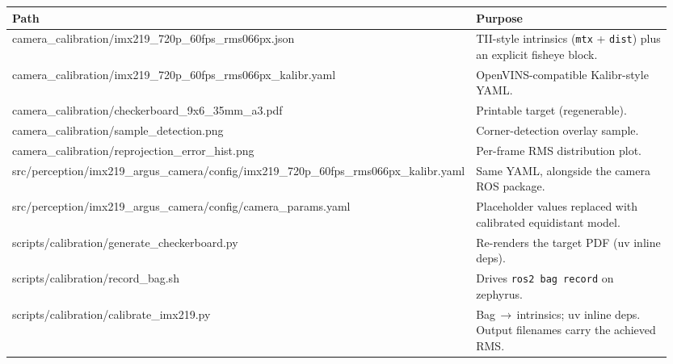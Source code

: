 \documentclass[11pt,a4paper]{article}
\begin{document}
\begin{center}
\sffamily\footnotesize
\renewcommand{\arraystretch}{1.45}
\begin{tabular}{@{}>{\ttfamily\color{ethText}}p{0.55\linewidth} >{\sffamily\color{ethMuted}}p{0.40\linewidth}@{}}
\toprule
\textsf{\bfseries\color{ethAccentBold}Path} & \textsf{\bfseries\color{ethAccentBold}Purpose}\\
\midrule
camera\_calibration/\newline\hspace*{8pt}imx219\_720p\_60fps\_rms066px.json
  & TII-style intrinsics (\texttt{mtx} + \texttt{dist}) plus an explicit fisheye block.\\
camera\_calibration/\newline\hspace*{8pt}imx219\_720p\_60fps\_rms066px\_kalibr.yaml
  & OpenVINS-compatible Kalibr-style YAML.\\
camera\_calibration/\newline\hspace*{8pt}checkerboard\_9x6\_35mm\_a3.pdf
  & Printable target (regenerable).\\
camera\_calibration/sample\_detection.png
  & Corner-detection overlay sample.\\
camera\_calibration/\newline\hspace*{8pt}reprojection\_error\_hist.png
  & Per-frame RMS distribution plot.\\
src/perception/imx219\_argus\_camera/\newline\hspace*{8pt}config/imx219\_720p\_60fps\_rms066px\_kalibr.yaml
  & Same YAML, alongside the camera ROS package.\\
src/perception/imx219\_argus\_camera/\newline\hspace*{8pt}config/camera\_params.yaml
  & Placeholder values replaced with calibrated equidistant model.\\
scripts/calibration/generate\_checkerboard.py
  & Re-renders the target PDF (uv inline deps).\\
scripts/calibration/record\_bag.sh
  & Drives \texttt{ros2 bag record} on zephyrus.\\
scripts/calibration/calibrate\_imx219.py
  & Bag\,$\rightarrow$\,intrinsics; uv inline deps. Output filenames carry the achieved RMS.\\
\bottomrule
\end{tabular}
\end{center}
\end{document}
